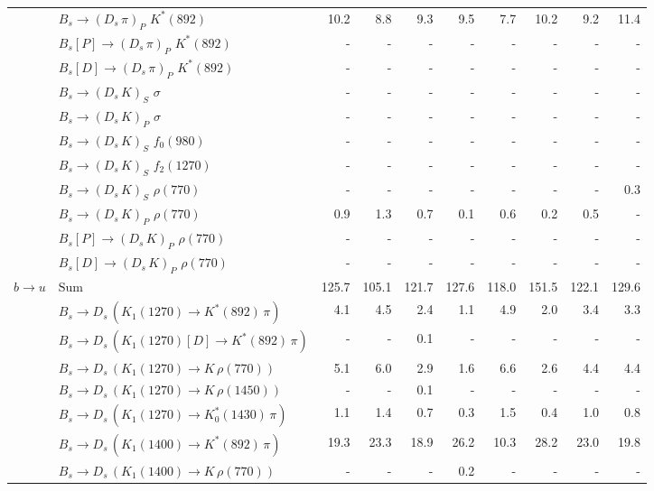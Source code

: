 \begin{tabular}{l l  r  r  r  r  r  r  r  r  }
 & $B_s \to ( D_s \, \pi)_{P} \, \, K^{*}(892)$ & 10.2 & 8.8 & 9.3 & 9.5 & 7.7 & 10.2 & 9.2 & 11.4 \\ 
 & $B_s[P] \to ( D_s \, \pi)_{P} \, \, K^{*}(892)$ & -  & -  & -  & -  & -  & -  & -  & -  \\ 
 & $B_s[D] \to ( D_s \, \pi)_{P} \, \, K^{*}(892)$ & -  & -  & -  & -  & -  & -  & -  & -  \\ 
 & $B_s \to ( D_s \, K)_{S} \, \, \sigma$ & -  & -  & -  & -  & -  & -  & -  & -  \\ 
 & $B_s \to ( D_s \, K)_{P} \, \, \sigma$ & -  & -  & -  & -  & -  & -  & -  & -  \\ 
 & $B_s \to ( D_s \, K)_{S} \, \, f_0(980)$ & -  & -  & -  & -  & -  & -  & -  & -  \\ 
 & $B_s \to ( D_s \, K)_{S} \, \, f_2(1270)$ & -  & -  & -  & -  & -  & -  & -  & -  \\ 
 & $B_s \to ( D_s \, K)_{S} \, \, \rho(770)$ & -  & -  & -  & -  & -  & -  & -  & 0.3 \\ 
 & $B_s \to ( D_s \, K)_{P} \, \, \rho(770)$ & 0.9 & 1.3 & 0.7 & 0.1 & 0.6 & 0.2 & 0.5 & -  \\ 
 & $B_s[P] \to ( D_s \, K)_{P} \, \, \rho(770)$ & -  & -  & -  & -  & -  & -  & -  & -  \\ 
 & $B_s[D] \to ( D_s \, K)_{P} \, \, \rho(770)$ & -  & -  & -  & -  & -  & -  & -  & -  \\ 
\multirow{28}{*}{$b \to u$}  & $\text{Sum}$ & 125.7 & 105.1 & 121.7 & 127.6 & 118.0 & 151.5 & 122.1 & 129.6 \\ 
\hline
 & $B_s \to D_s \, ( K_1(1270) \to K^{*}(892) \, \pi )$ & 4.1 & 4.5 & 2.4 & 1.1 & 4.9 & 2.0 & 3.4 & 3.3 \\ 
 & $B_s \to D_s \, ( K_1(1270)[D] \to K^{*}(892) \, \pi )$ & -  & -  & 0.1 & -  & -  & -  & -  & -  \\ 
 & $B_s \to D_s \, ( K_1(1270) \to K \, \rho(770) )$ & 5.1 & 6.0 & 2.9 & 1.6 & 6.6 & 2.6 & 4.4 & 4.4 \\ 
 & $B_s \to D_s \, ( K_1(1270) \to K \, \rho(1450) )$ & -  & -  & 0.1 & -  & -  & -  & -  & -  \\ 
 & $B_s \to D_s \, ( K_1(1270) \to K^{*}_{0}(1430) \, \pi )$ & 1.1 & 1.4 & 0.7 & 0.3 & 1.5 & 0.4 & 1.0 & 0.8 \\ 
 & $B_s \to D_s \, ( K_1(1400) \to K^{*}(892) \, \pi )$ & 19.3 & 23.3 & 18.9 & 26.2 & 10.3 & 28.2 & 23.0 & 19.8 \\ 
 & $B_s \to D_s \, ( K_1(1400) \to K \, \rho(770) )$ & -  & -  & -  & 0.2 & -  & -  & -  & -  \\ 

\end{tabular}
